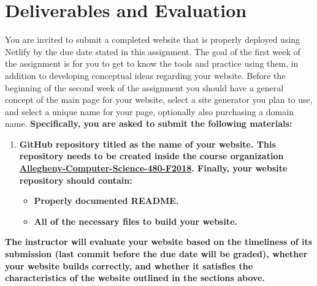 \documentclass[11pt]{article}
\begin{document}
\section*{Deliverables and Evaluation}
You are invited to submit a completed website that is properly deployed using Netlify by the due date stated in this assignment. The goal of the first week of the assignment is for you to get to know the tools and practice using them, in addition to developing conceptual ideas regarding your website. Before the beginning of the second week of the assignment you should have a general concept of the main page for your website, select a site generator you plan to use, and select a unique name for your page, optionally also purchasing a domain name.
\textbf{
Specifically, you are asked to submit the following materials:}
\begin{enumerate}
	\item \textbf{GitHub repository titled as the name of your website. This repository needs to be created inside the course organization \href{https://github.com/orgs/Allegheny-Computer-Science-480-F2018}{Allegheny-Computer-Science-480-F2018}. Finally, your website repository should contain:}
	\begin{itemize}
		\item \textbf{Properly documented README.}
		\item\textbf{ All of the necessary files to build your website. }
	\end{itemize}	 
\end{enumerate}

\textbf{The instructor will evaluate your website based on the timeliness of its submission (last commit before the due date will be graded), whether your website builds correctly, and whether it satisfies the characteristics of the website outlined in the sections above.}
\end{document}
